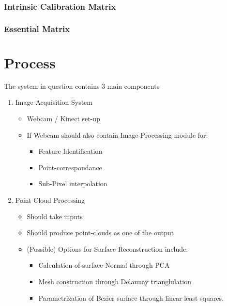 \documentclass{report}
\begin{document}
\subsection*{Intrinsic Calibration Matrix}

\subsection*{Essential Matrix}

\chapter{Process}
The system in question contains 3 main components
\begin{enumerate}
	\item Image Acquisition System
	\begin{itemize}
		\item Webcam / Kinect set-up
		\item If Webcam should also contain Image-Processing module for:
		\begin{itemize}
			\item Feature Identification
			\item Point-correspondance
			\item Sub-Pixel interpolation
		\end{itemize}
	\end{itemize}
	\item Point Cloud Processing
	\begin{itemize}
		\item Should take inputs
		\item Should produce point-clouds as one of the output
		\item (Possible) Options for Surface Reconstruction include:
		\begin{itemize}
			\item Calculation of surface Normal through PCA
			\item Mesh construction through Delaunay trianglulation
			\item Parametrization of Bezier surface through linear-least squares.
		\end{itemize}

	\end{itemize}

\end{enumerate}

\begin{equation*}
\end{equation*}


%
\end{document}
